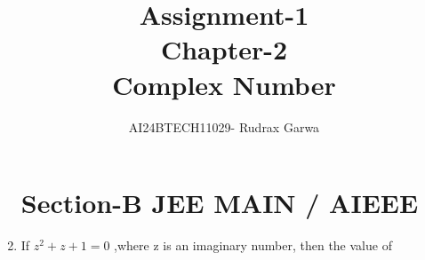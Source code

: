 \documentclass[journal,12pt,twocolumn,article]{IEEEtran}
\theoremstyle{remark}
\begin{document}
                                   
\begin{enumerate}[start = 14]                      

\vspace{3cm}                                       
\title{Assignment-1 \\Chapter-2\\Complex Number}
\author{AI24BTECH11029- Rudrax Garwa}              
\maketitle
\newpage                                           
\bigskip
\section*{Section-B   JEE MAIN / AIEEE}
\item If $z^2+z+1=0$ ,where z is an imaginary number, then the value of
\end{enumerate}
\end{document}
